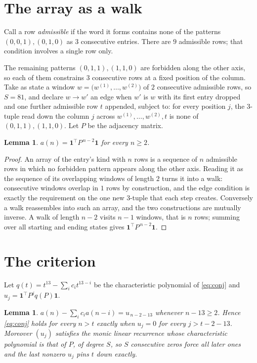 \documentclass[11pt,a4paper]{article}
\theoremstyle{plain}
\newtheorem{lemma}[theorem]{Lemma}
\theoremstyle{definition}
\begin{document}
\section{The array as a walk}

Call a row \emph{admissible} if the word it forms contains none of the patterns
$(0,0,1), (0,1,0)$ as $3$ consecutive entries. There are $9$ admissible rows; that condition
involves a single row only.

The remaining patterns $(0,1,1), (1,1,0)$ are forbidden along the other axis, so each of them
constrains $3$ consecutive rows at a fixed position of the column. Take as state a
window $w=\bigl(w^{(1)},\dots,w^{(2)}\bigr)$ of $2$ consecutive admissible
rows, so $S=81$, and declare $w\to w'$ an edge when $w'$ is $w$ with its first entry
dropped and one further admissible row $t$ appended, subject to: for every position
$j$, the $3$-tuple read down the column $j$ across $w^{(1)},\dots,w^{(2)},t$
is none of $(0,1,1), (1,1,0)$. Let $P$ be the adjacency matrix.

\begin{lemma}\label{lem:walk}
$a(n)=\mathbf{1}^{\!\top}P^{\,n-2}\mathbf{1}$ for every $n\ge2$.
\end{lemma}

\begin{proof}
An array of the entry's kind with $n$ rows is a sequence of $n$ admissible rows in
which no forbidden pattern appears along the other axis. Reading it as the sequence of its
overlapping windows of length $2$ turns it into a walk: consecutive windows overlap in
$1$ rows by construction, and the edge condition is exactly the requirement on the one
new $3$-tuple that each step creates. Conversely a walk reassembles into such an array,
and the two constructions are mutually inverse. A walk of length $n-2$ visits $n-1$
windows, that is $n$ rows; summing over all starting and ending states gives
$\mathbf{1}^{\!\top}P^{\,n-2}\mathbf{1}$.
\end{proof}

\section{The criterion}

Let $q(t)=t^{13}-\sum_i c_i t^{13-i}$ be the characteristic polynomial of
\eqref{eq:conj} and $u_j=\mathbf{1}^{\!\top}P^{j}q(P)\mathbf{1}$.

\begin{lemma}\label{lem:crit}
$a(n)-\sum_i c_i a(n-i)=u_{\,n-2-13}$ whenever $n-13\ge2$. Hence
\eqref{eq:conj} holds for every $n>t$ exactly when $u_j=0$ for every
$j>t-2-13$. Moreover $(u_j)$ satisfies the monic linear recurrence whose
characteristic polynomial is that of $P$, of degree $S$, so $S$ consecutive zeros force all
later ones and the last nonzero $u_j$ pins $t$ down exactly.
\end{lemma}
\end{document}
